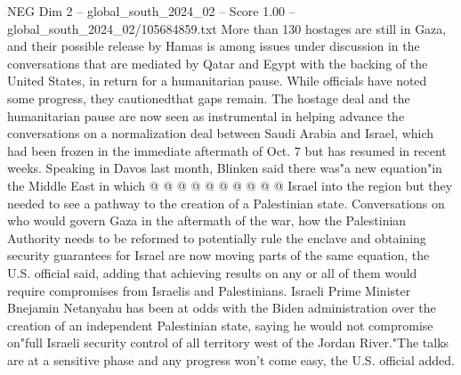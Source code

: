 \begin{textsample}{NEG Dim 2 – global\_south\_2024\_02 – Score 1.00 – global\_south\_2024\_02/105684859.txt}
More than 130 hostages are still in Gaza, and their possible release by Hamas is among issues under discussion in the conversations that are mediated by Qatar and Egypt with the backing of the United States, in return for a humanitarian pause.
While officials have noted some progress, they cautionedthat gaps remain.
The hostage deal and the humanitarian pause are now seen as instrumental in helping advance the conversations on a normalization deal between Saudi Arabia and Israel, which had been frozen in the immediate aftermath of Oct. 7 but has resumed in recent weeks.
Speaking in Davos last month, Blinken said there was"a new equation"in the Middle East in which @ @ @ @ @ @ @ @ @ @ Israel into the region but they needed to see a pathway to the creation of a Palestinian state.
Conversations on who would govern Gaza in the aftermath of the war, how the Palestinian Authority needs to be reformed to potentially rule the enclave and obtaining security guarantees for Israel are now moving parts of the same equation, the U.S. official said, adding that achieving results on any or all of them would require compromises from Israelis and Palestinians.
Israeli Prime Minister Bnejamin Netanyahu has been at odds with the Biden administration over the creation of an independent Palestinian state, saying he would not compromise on"full Israeli security control of all territory west of the Jordan River."The talks are at a sensitive phase and any progress won't come easy, the U.S. official added.

\end{textsample}
